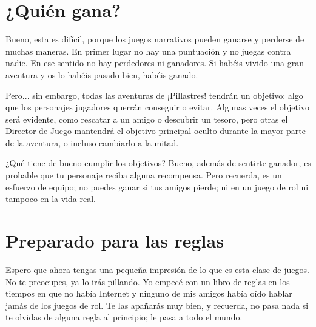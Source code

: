 \section{¿Quién gana?}

Bueno, esta es difícil, porque los juegos narrativos pueden ganarse y perderse de muchas maneras. En primer lugar no hay una puntuación y no juegas contra nadie. En ese sentido no hay perdedores ni ganadores. Si habéis vivido una gran aventura y os lo habéis pasado bien, habéis ganado.

Pero... sin embargo, todas las aventuras de ¡Pillastres! tendrán un objetivo: algo que los personajes jugadores querrán conseguir o evitar. Algunas veces el objetivo será evidente, como rescatar a un amigo o descubrir un tesoro, pero otras el Director de Juego mantendrá el objetivo principal oculto durante la mayor parte de la aventura, o incluso cambiarlo a la mitad.

¿Qué tiene de bueno cumplir los objetivos? Bueno, además de sentirte ganador, es probable que tu personaje reciba alguna recompensa. Pero recuerda, es un esfuerzo de equipo; no puedes ganar si tus amigos pierde; ni en un juego de rol ni tampoco en la vida real.

\section{Preparado para las reglas}

Espero que ahora tengas una pequeña impresión de lo que es esta clase de juegos. No te preocupes, ya lo irás pillando. Yo empecé con un libro de reglas en los tiempos en que no había Internet y ninguno de mis amigos había oído hablar jamás de los juegos de rol. Te las apañarás muy bien, y recuerda, no pasa nada si te olvidas de alguna regla al principio; le pasa a todo el mundo.